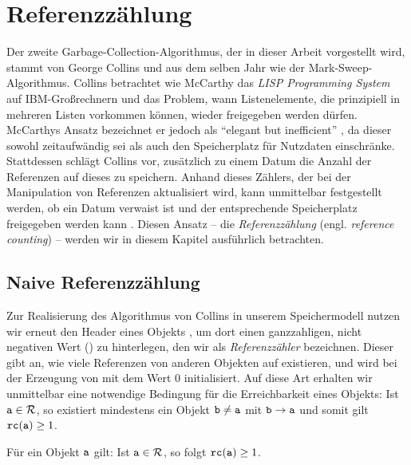 \chapter{Referenzzählung}
\label{cha:reference-counting}
Der zweite Garbage-Collection-Algorithmus, der in dieser Arbeit vorgestellt wird, stammt von George Collins und aus dem selben Jahr wie der Mark-Sweep-Algorithmus.
Collins betrachtet wie McCarthy das \textit{LISP Programming System} auf IBM-Großrechnern und das Problem, wann Listenelemente, die prinzipiell in mehreren Listen vorkommen können, wieder freigegeben werden dürfen.
McCarthys Ansatz bezeichnet er jedoch als \enquote{elegant but inefficient} \cite[S. 655]{collins1960}, da dieser sowohl zeitaufwändig sei als auch den Speicherplatz für Nutzdaten einschränke.
Stattdessen schlägt Collins vor, zusätzlich zu einem Datum die Anzahl der Referenzen auf dieses zu speichern.
Anhand dieses Zählers, der bei der Manipulation von Referenzen aktualisiert wird, kann unmittelbar festgestellt werden, ob ein Datum verwaist ist und der entsprechende Speicherplatz freigegeben werden kann \cite[S. 656f]{collins1960}.
Diesen Ansatz -- die \textit{Referenzzählung} (engl. \textit{reference counting}) -- werden wir in diesem Kapitel ausführlich betrachten.

\section{Naive Referenzzählung}
\label{sec:naive-rc}
Zur Realisierung des Algorithmus von Collins in unserem Speichermodell nutzen wir erneut den Header eines Objekts , um dort einen ganzzahligen, nicht negativen Wert () zu hinterlegen, den wir als \textit{Referenzzähler} bezeichnen.
Dieser gibt an, wie viele Referenzen von anderen Objekten auf  existieren, und wird bei der Erzeugung von  mit dem Wert $0$ initialisiert.
Auf diese Art erhalten wir unmittelbar eine notwendige Bedingung für die Erreichbarkeit eines Objekts:
Ist $\texttt{a} \in \mathcal{R}$, so existiert mindestens ein Objekt $\texttt{b} \neq \texttt{a}$ mit $\texttt{b} \rightarrow \texttt{a}$ und somit gilt $\texttt{rc}(\texttt{a}) \geq 1$.

\begin{mybox}
\begin{lemma}
\label{lemma:notwendig-rc}
	Für ein Objekt $\texttt{a}$ gilt: Ist $\texttt{a} \in \mathcal{R}$, so folgt $\texttt{rc}(\texttt{a}) \geq 1$.
\end{lemma}
\end{mybox}

